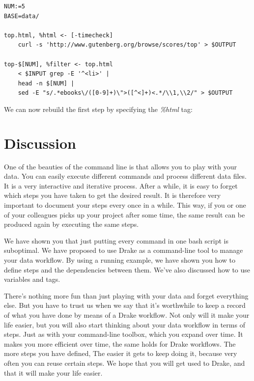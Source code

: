 \documentclass[
]{book}
\newenvironment{Shaded}{\begin{snugshade}}{\end{snugshade}}
\newcommand{\ExtensionTok}[1]{#1}
\newcommand{\NormalTok}[1]{#1}
\newcommand{\StringTok}[1]{\textcolor[rgb]{0.31,0.60,0.02}{#1}}
\theoremstyle{definition}
\theoremstyle{definition}
\theoremstyle{definition}
\theoremstyle{remark}
\begin{document}
\begin{verbatim}
NUM:=5
BASE=data/

top.html, %html <- [-timecheck]
    curl -s 'http://www.gutenberg.org/browse/scores/top' > $OUTPUT

top-$[NUM], %filter <- top.html
    < $INPUT grep -E '^<li>' |
    head -n $[NUM] |
    sed -E "s/.*ebooks\/([0-9]+)\">([^<]+)<.*/\\1,\\2/" > $OUTPUT
\end{verbatim}

We can now rebuild the first step by specifying the \emph{\%html} tag:

\begin{Shaded}
\end{Shaded}

\hypertarget{discussion}{%
\section{Discussion}\label{discussion}}

One of the beauties of the command line is that allows you to play with your data. You can easily execute different commands and process different data files. It is a very interactive and iterative process. After a while, it is easy to forget which steps you have taken to get the desired result. It is therefore very important to document your steps every once in a while. This way, if you or one of your colleagues picks up your project after some time, the same result can be produced again by executing the same steps.

We have shown you that just putting every command in one bash script is suboptimal. We have proposed to use Drake as a command-line tool to manage your data workflow. By using a running example, we have shown you how to define steps and the dependencies between them. We've also discussed how to use variables and tags.

There's nothing more fun than just playing with your data and forget everything else. But you have to trust us when we say that it's worthwhile to keep a record of what you have done by means of a Drake workflow. Not only will it make your life easier, but you will also start thinking about your data workflow in terms of steps. Just as with your command-line toolbox, which you expand over time. It makes you more efficient over time, the same holds for Drake workflows. The more steps you have defined, The easier it gets to keep doing it, because very often you can reuse certain steps. We hope that you will get used to Drake, and that it will make your life easier.
\end{document}
